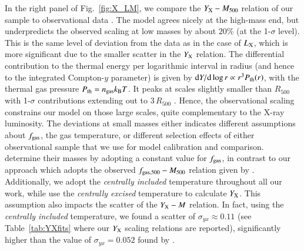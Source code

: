 \documentclass[useAMS,usenatbib]{mn2e}
\newcommand{\dd}{\mathrm{d}}
\begin{document}
In the right panel of Fig.~\ref{fig:X_LM}, we compare the
$Y_{{\mathrm{X}}}-M_{500}$ relation of our sample to observational data
\citep{2010MNRAS.406.1773M}. The model agrees nicely at the high-mass end, but
underpredicts the observed scaling at low masses by about $20\%$ (at the
1-$\sigma$ level). This is the same level of deviation from the data as in the
case of $L_{{\mathrm{X}}}$, which is more significant due to the smaller scatter in
the $Y_{{\mathrm{X}}}$ relation. The differential contribution to the thermal energy
per logarithmic interval in radius (and hence to the integrated Compton-$y$
parameter) is given by $\dd Y /\dd\log r \propto r^3 P_{\rmn{th}}(r)$, with the
thermal gas pressure $P_{{\mathrm{th}}}=n_{{\mathrm{gas}}}k_{{\mathrm{B}}}T$. It peaks at
scales slightly smaller than $R_{500}$ with 1-$\sigma$ contributions extending
out to $3\,R_{500}$ \citep{2010ApJ...725...91B}. Hence, the observational
scaling constrains our model on those large scales, quite complementary to the
X-ray luminosity. The deviations at small masses either indicates different
assumptions about $f_{{\mathrm{gas}}}$, the gas temperature, or different selection
effects of either observational sample that we use for model calibration and
comparison.  \cite{2010MNRAS.406.1773M} determine their masses by adopting a
constant value for $f_{{\mathrm{gas}}}$, in contrast to our approach which adopts the
observed $f_{{\mathrm{gas}},500}-M_{500}$ relation given by
\cite{2009ApJ...693.1142S}. Additionally, we adopt the
\cite{2010MNRAS.406.1773M} \emph{centrally included} temperature throughout all
our work, while \cite{2010MNRAS.406.1773M} use the \emph{centrally excised}
temperature to calculate $Y_{{\mathrm{X}}}$. This assumption also impacts the scatter
of the $Y_{{\mathrm{X}}}-M$ relation. In fact, using the \emph{centrally included}
temperature, we found a scatter of $\sigma_{yx} \approx 0.11$ (see
Table~\ref{tab:YXfits} where our $Y_{{\mathrm{X}}}$ scaling relations are reported),
significantly higher than the value of $\sigma_{yx} = 0.052$ found by
\cite{2010MNRAS.406.1773M}.
\end{document}
